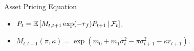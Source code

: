 \documentclass[smaller, aspectratio=169]{beamer}
\begin{document}
\begin{frame}[c]{Asset Pricing Equation}

    \begin{itemize}
        \item $\displaystyle P_t = \mathbb{E}\left[M_{t,t+1} \exp(-r_f) P_{t+1} \,\middle\vert\, \mathcal{F}_{t} \right]$.
            \bigskip
%
        \item $\displaystyle M_{t,t+1}(\pi, \kappa) = \exp\left(m_0 + m_1 \sigma^2_t - \pi \sigma^2_{t+1} - \kappa r_{t+1}\right)$.
    \end{itemize}

\end{frame}
\end{document}
